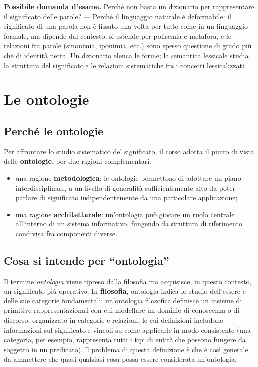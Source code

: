 \documentclass[11pt,a4paper]{report}
\newcommand{\domandaesame}[1]{\begin{esame}\textbf{Possibile domanda d'esame.} #1\end{esame}}
\begin{document}
\domandaesame{Perché non basta un dizionario per rappresentare il significato delle parole? --- Perché il linguaggio naturale è deformabile: il significato di una parola non è fissato una volta per tutte come in un linguaggio formale, ma dipende dal contesto, si estende per polisemia e metafora, e le relazioni fra parole (sinonimia, iponimia, ecc.) sono spesso questione di grado più che di identità netta. Un dizionario elenca le forme; la semantica lessicale studia la struttura del significato e le relazioni sistematiche fra i concetti lessicalizzati.}

\section{Le ontologie}

\subsection{Perché le ontologie}

Per affrontare lo studio sistematico del significato, il corso adotta il punto di vista delle \textbf{ontologie}, per due ragioni complementari:
\begin{itemize}
  \item una ragione \textbf{metodologica}: le ontologie permettono di adottare un piano interdisciplinare, a un livello di generalità sufficientemente alto da poter parlare di significato indipendentemente da una particolare applicazione;
  \item una ragione \textbf{architetturale}: un'ontologia può giocare un ruolo centrale all'interno di un sistema informativo, fungendo da struttura di riferimento condivisa fra componenti diverse.
\end{itemize}

\subsection{Cosa si intende per ``ontologia''}

Il termine \emph{ontologia} viene ripreso dalla filosofia ma acquisisce, in questo contesto, un significato più operativo. In \textbf{filosofia}, ontologia indica lo studio dell'essere e delle sue categorie fondamentali: un'ontologia filosofica definisce un insieme di primitive rappresentazionali con cui modellare un dominio di conoscenza o di discorso, organizzato in categorie e relazioni, le cui definizioni includono informazioni sul significato e vincoli su come applicarle in modo consistente (una categoria, per esempio, rappresenta tutti i tipi di entità che possono fungere da soggetto in un predicato). Il problema di questa definizione è che è così generale da ammettere che quasi qualsiasi cosa possa essere considerata un'ontologia.
\end{document}
